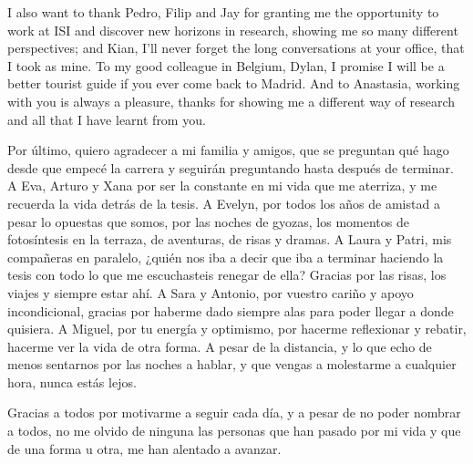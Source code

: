 I also want to thank Pedro, Filip and Jay for granting me the opportunity to work at ISI and discover new horizons in research, showing me so many different perspectives; and Kian, I'll never forget the long conversations at your office, that I took as mine. 
To my good colleague in Belgium, Dylan, I promise I will be a better tourist guide if you ever come back to Madrid. 
And to Anastasia, working with you is always a pleasure, thanks for showing me a different way of research and all that I have learnt from you.

Por último, quiero agradecer a mi familia y amigos, que se preguntan qué hago desde que empecé la carrera y seguirán preguntando hasta después de terminar. A Eva, Arturo y Xana por ser la constante en mi vida que me aterriza, y me recuerda la vida detrás de la tesis. A Evelyn, por todos los años de amistad a pesar lo opuestas que somos, por las noches de gyozas, los momentos de fotosíntesis en la terraza, de aventuras, de risas y dramas. 
A Laura y Patri, mis compañeras en paralelo, ¿quién nos iba a decir que iba a terminar haciendo la tesis con todo lo que me escuchasteis renegar de ella? Gracias por las risas, los viajes y siempre estar ahí. 
A Sara y Antonio, por vuestro cariño y apoyo incondicional, gracias por haberme dado siempre alas para poder llegar a donde quisiera. 
A Miguel, por tu energía y optimismo, por hacerme reflexionar y rebatir, hacerme ver la vida de otra forma. A pesar de la distancia, y lo que echo de menos sentarnos por las noches a hablar, y que vengas a molestarme a cualquier hora, nunca estás lejos. 

Gracias a todos por motivarme a seguir cada día, y a pesar de no poder nombrar a todos, no me olvido de ninguna las personas que han pasado por mi vida y que de una forma u otra, me han alentado a avanzar. 




